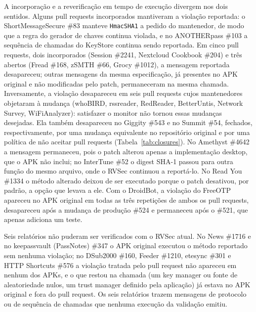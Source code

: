 \documentclass[conference]{IEEEtran}
\begin{document}
A incorporação e a reverificação em tempo de execução divergem nos dois sentidos. Alguns pull requests
incorporados mantiveram a violação reportada: o ShortMessageSecure \#83 manteve \texttt{HmacSHA1} a pedido do mantenedor, de modo que
a regra do gerador de chaves continua violada, e no ANOTHERpass \#103 a sequência de chamadas
do KeyStore continua sendo reportada. Em cinco pull requests, dois incorporados (Session \#2241,
Nextcloud Cookbook \#204) e três abertos (Fread \#168, zSMTH \#66, Grocy
\#1012), a mensagem reportada desapareceu; outras mensagens da mesma especificação, já presentes no
APK original e não modificadas pelo patch, permaneceram na mesma chamada.
Inversamente, a violação desapareceu em seis pull requests cujos mantenedores
objetaram à mudança (whoBIRD, rssreader, RedReader, BetterUntis, Network
Survey, WiFiAnalyzer): satisfazer o monitor não tornou essas mudanças
desejadas. Ela também desapareceu no Giggity \#543 e no Summit \#54, fechados, respectivamente, por uma
mudança equivalente no repositório original e por uma política de não aceitar
pull requests (Tabela~\ref{tab:closures}). No Amethyst \#4642 a mensagem
permaneceu, pois o patch alterou apenas a implementação desktop, que o APK não
inclui; no InterTune \#52 o digest SHA-1 passou para outra função do
mesmo arquivo, onde o RVSec continuou a reportá-lo. No Read You \#1334 o método
alterado deixou de ser executado porque o patch desativou, por padrão, a opção que
levava a ele.
Com o DroidBot, a violação do FreeOTP apareceu no APK original em todas as
três repetições de ambos os pull requests, desapareceu após a mudança de
produção \#524 e permaneceu após o \#521, que apenas adiciona um teste.

Seis relatórios não puderam ser verificados com o RVSec atual. No News \#1716 e no
keepassvault (PassNotes) \#347 o APK original executou o método reportado sem nenhuma
violação; no DSub2000 \#160, Feeder \#1210, etesync \#301 e HTTP Shortcuts
\#576 a violação tratada pelo pull request não apareceu em nenhum dos APKs, e
o que restou na chamada (um key manager ou fonte de aleatoriedade nulos, um
trust manager definido pela aplicação) já estava no APK original e fora
do pull request. Os seis relatórios trazem mensagens de protocolo ou de sequência de chamadas que
nenhuma execução da validação emitiu.
\end{document}
